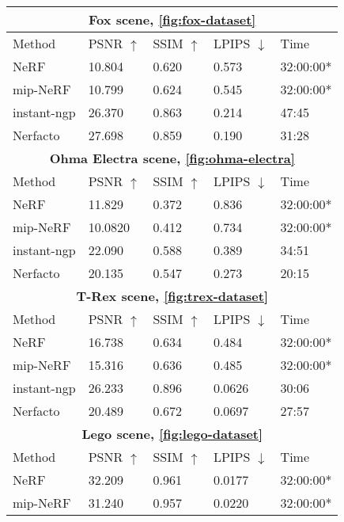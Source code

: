 \begin{table}[h]
\centering
\begin{tabular}{|l|llll|}
\hline
\multicolumn{5}{|c|}{\textbf{Fox scene, \autoref{fig:fox-dataset}}} \\ 
\hline
Method  & PSNR $\uparrow$ & SSIM $\uparrow$ & LPIPS $\downarrow$& Time  \\ 
\hline
NeRF        & 10.804    & 0.620     & 0.573    & 32:00:00*   \\
mip-NeRF    & 10.799    & 0.624     & 0.545    & 32:00:00*    \\
instant-ngp & 26.370    & 0.863     & 0.214    & 47:45    \\
Nerfacto    & 27.698    & 0.859     & 0.190    & 31:28    \\
\hline
\hline
\multicolumn{5}{|c|}{\textbf{Ohma Electra scene, \autoref{fig:ohma-electra}}} \\ 
\hline
Method  & PSNR $\uparrow$ & SSIM $\uparrow$ & LPIPS $\downarrow$& Time  \\ 
\hline
NeRF        & 11.829    &  0.372     & 0.836    & 32:00:00*    \\
mip-NeRF    & 10.0820    & 0.412     & 0.734    & 32:00:00*    \\
instant-ngp & 22.090    & 0.588     & 0.389    & 34:51    \\
Nerfacto    & 20.135    & 0.547     & 0.273    & 20:15    \\ 
\hline
\hline
\multicolumn{5}{|c|}{\textbf{T-Rex scene, \autoref{fig:trex-dataset}}} \\ 
\hline
Method  & PSNR $\uparrow$ & SSIM $\uparrow$ & LPIPS $\downarrow$& Time  \\ 
\hline
NeRF        & 16.738    & 0.634     & 0.484    & 32:00:00*    \\
mip-NeRF    & 15.316    & 0.636     & 0.485    & 32:00:00*    \\
instant-ngp    & 26.233    & 0.896     & 0.0626    & 30:06    \\
Nerfacto    & 20.489    & 0.672     & 0.0697    & 27:57    \\ 
\hline
\hline
\multicolumn{5}{|c|}{\textbf{Lego scene, \autoref{fig:lego-dataset}}} \\ 
\hline
Method  & PSNR $\uparrow$ & SSIM $\uparrow$ & LPIPS $\downarrow$& Time  \\ 
\hline
NeRF        & 32.209    & 0.961     & 0.0177    & 32:00:00*    \\
mip-NeRF    & 31.240    & 0.957     & 0.0220    & 32:00:00*    \\

\end{tabular}
\end{table}
